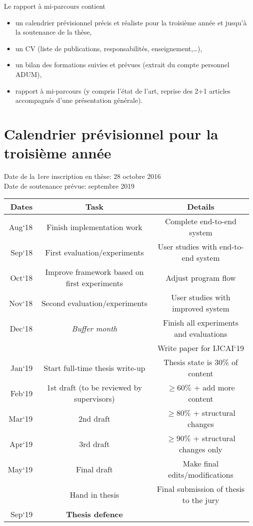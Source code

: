 Le rapport à mi-parcours contient
\begin{itemize}
\item un calendrier prévisionnel précis et réaliste pour la troisième année et jusqu’à la soutenance de la thèse,
\item un CV (liste de publications, responsabilités, enseignement,…),
\item un bilan des formations suivies et prévues (extrait du compte personnel ADUM),
\item rapport à mi-parcours (y compris l'état de l'art, reprise des 2+1 articles accompagnés d'une présentation générale).
\end{itemize}

\section*{Calendrier prévisionnel pour la troisième année}
Date de la 1ere inscription en thèse: 28 octobre 2016\\
Date de soutenance prévue: septembre 2019\\

\begin{table}[ht]
\begin{center}
\begin{tabular}{r|c|c}
Dates & Task & Details\\ \hline
Aug`18 & Finish implementation work & Complete end-to-end system\\
Sep`18 & First evaluation/experiments & User studies with end-to-end system\\
Oct`18 &Improve framework based on first experiments & Adjust program flow \\
Nov`18 & Second evaluation/experiments & User studies with improved system\\
Dec`18 & \textit{Buffer month} & Finish all experiments and evaluations\\
 & & Write paper for IJCAI`19\\ \hline
Jan`19 & Start full-time thesis write-up & Thesis state is 30\% of content \\
Feb`19 & 1st draft (to be reviewed by supervisors) & $\geq 60\%$ + add more content \\
Mar`19 & 2nd draft & $\geq80\%$ + structural changes \\
Apr`19 & 3rd draft & $\geq 90\%$ + structural changes only \\
May`19 & Final draft & Make final edits/modifications\\
 & Hand in thesis & Final submission of thesis to the jury\\
Sep`19 & \textbf{Thesis defence} & \\
\end{tabular}
\end{center}
\end{table}


